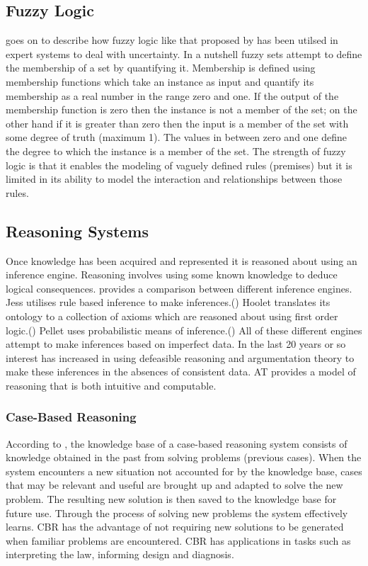 \subsection{Fuzzy Logic}

\cite{kandel1991fuzzy} goes on to describe how fuzzy logic like that proposed by \cite{zadeh1965fuzzy} has been utilsed in expert systems to deal with uncertainty. In a nutshell fuzzy sets attempt to define the membership of a set by quantifying it. Membership is defined using membership functions which take an instance as input and quantify its membership as a real number in the range zero and one. If the output of the membership function is zero then the instance is not a member of the set; on the other hand if it is greater than zero then the input is a member of the set with some degree of truth (maximum 1). The values in between zero and one define the degree to which the instance is a member of the set. The strength of fuzzy logic is that it enables the modeling of vaguely defined rules (premises) but it is limited in its ability to model the interaction and relationships between those rules.

\subsection{Reasoning Systems}

Once knowledge has been acquired and represented it is reasoned about using an inference engine. Reasoning involves using some known knowledge to deduce logical consequences. \cite{singh2010comparative} provides a comparison between different inference engines. Jess utilises rule based inference to make inferences.(\cite{o2012pair}) Hoolet translates its ontology to a collection of axioms which are reasoned about using first order logic.(\cite{bechhoferhoolet}) Pellet uses probabilistic means of inference.(\cite{parsia2004pellet}) All of these different engines attempt to make inferences based on imperfect data. In the last 20 years or so interest has increased in using defeasible reasoning and argumentation theory to make these inferences in the absences of consistent data. AT provides a model of reasoning that is both intuitive and computable.

\subsubsection{Case-Based Reasoning}

According to \cite{leake2003case}, the knowledge base of a case-based reasoning system consists of knowledge obtained in the past from solving problems (previous cases). When the system encounters a new situation not accounted for by the knowledge base, cases that may be relevant and useful are brought up and adapted to solve the new problem. The resulting new solution is then saved to the knowledge base for future use. Through the process of solving new problems the system effectively learns. CBR has the advantage of not requiring new solutions to be generated when familiar problems are encountered. CBR has applications in tasks such as interpreting the law, informing design and diagnosis.

